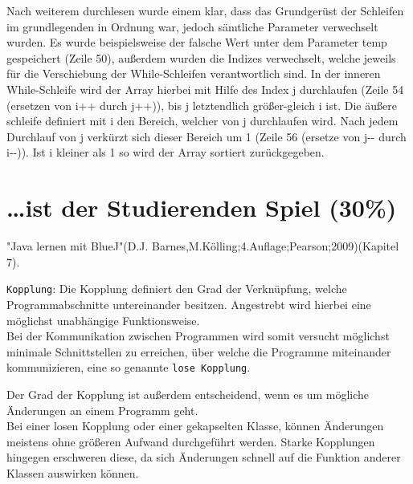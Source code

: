 \documentclass{pi1}
\begin{document}
Nach weiterem durchlesen wurde einem klar, dass das Grundgerüst der Schleifen im grundlegenden in Ordnung war, jedoch sämtliche Parameter verwechselt wurden. Es wurde beispielsweise der falsche Wert unter dem Parameter temp gespeichert (Zeile 50), außerdem wurden die Indizes verwechselt, welche jeweils für die Verschiebung der While-Schleifen verantwortlich sind.\newline
In der inneren While-Schleife wird der Array hierbei mit Hilfe des Index j durchlaufen (Zeile 54 (ersetzen von i++ durch j++)), bis j letztendlich größer-gleich i ist.
Die äußere schleife definiert mit i den Bereich, welcher von j durchlaufen wird. Nach jedem Durchlauf von j verkürzt sich dieser Bereich um 1 (Zeile 56 (ersetze von j-{}- durch i-{}-)).
Ist i kleiner als 1 so wird der Array sortiert zurückgegeben.




\section{\ldots ist der Studierenden Spiel (30\%)}
"Java lernen mit BlueJ"(D.J. Barnes,M.Kölling;4.Auflage;Pearson;2009)(Kapitel 7).

\texttt{Kopplung}:
Die Kopplung definiert den Grad der Verknüpfung, welche Programmabschnitte untereinander besitzen. Angestrebt wird hierbei eine möglichst unabhängige Funktionsweise.\\
Bei der Kommunikation zwischen Programmen wird somit versucht möglichst minimale Schnittstellen zu erreichen, über welche die Programme miteinander kommunizieren, eine so genannte \texttt{lose Kopplung}.\newline

Der Grad der Kopplung ist außerdem entscheidend, wenn es um mögliche Änderungen an einem Programm geht.\\
Bei einer losen Kopplung oder einer gekapselten Klasse, können Änderungen meistens ohne größeren Aufwand durchgeführt werden.
Starke Kopplungen hingegen erschweren diese, da sich Änderungen schnell auf die Funktion anderer Klassen auswirken können.\newline
\end{document}
